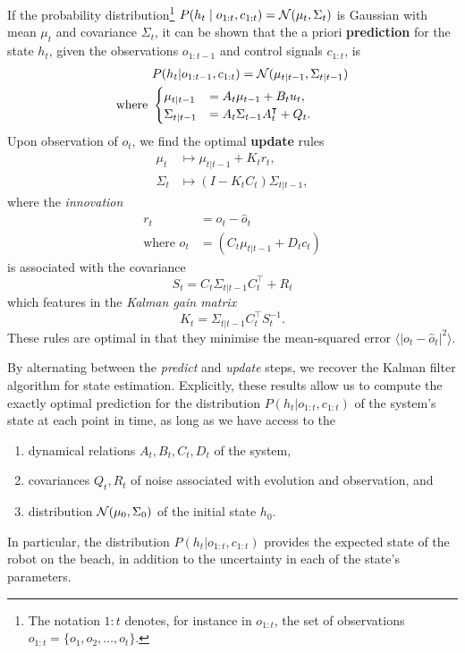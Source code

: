         If the probability distribution\footnote{The notation $1:t$ denotes, for instance in $o_{1:t}$, the set of observations $o_{1:t} = \{o_1, o_2, \ldots, o_t\}$.} $P(h_t \mid o_{1:t}, c_{1:t}) = \mathcal{N}(\mu_t, \Sigma_t)$ is Gaussian with mean $\mu_t$ and covariance $\Sigma_t$, it can be shown that the a priori \textbf{prediction} for the state $h_t$, given the observations $o_{1:t-1}$ and control signals $c_{1:t}$, is
        \begin{align}
            &P(h_t | o_{1:t-1}, c_{1:t}) = \mathcal{N}(\mu_{t|t-1}, \Sigma_{t|t-1}) \\
            \text{where }
            &\begin{cases}
                \mu_{t|t-1} &= A_t \mu_{t-1} + B_t u_t, \\
                \Sigma_{t|t-1} &= A_t \Sigma_{t-1} A_t^\intercal + Q_t.
            \end{cases}
        \end{align}
        Upon observation of $o_t$, we find the optimal \textbf{update} rules
        \begin{align}
            \mu_t &\mapsto \mu_{t|t-1} + K_t r_t, \\
            \Sigma_t &\mapsto (I - K_t C_t) \Sigma_{t|t-1},
        \end{align}
        where the \emph{innovation}
        \begin{align}
            r_t &= o_t - \hat{o}_t \\
            \text{where }\hat{o}_t &= (C_t \mu_{t|t-1} + D_t c_t)
        \end{align}
        is associated with the covariance
        \begin{equation}
            S_t = C_t \Sigma_{t|t-1} C_t^\intercal + R_t
        \end{equation}
        which features in the \emph{Kalman gain matrix}
        \begin{equation}
            K_t = \Sigma_{t|t-1} C_t^\intercal S_t^{-1}.
        \end{equation}
        These rules are optimal in that they minimise the mean-squared error $\langle \lvert o_t - \hat{o}_t \rvert^2 \rangle$.

        By alternating between the \emph{predict} and \emph{update} steps, we recover the Kalman filter algorithm for state estimation.
        Explicitly, these results allow us to compute the exactly optimal prediction for the distribution $P(h_t | o_{1:t}, c_{1:t})$ of the system's state at each point in time, as long as we have access to the
        \begin{enumerate}
            \item dynamical relations $A_t, B_t, C_t, D_t$ of the system,
            \item covariances $Q_t, R_t$ of noise associated with evolution and observation, and
            \item distribution $\mathcal{N}(\mu_0, \Sigma_0)$ of the initial state $h_0$.
        \end{enumerate}
        In particular, the distribution $P(h_t | o_{1:t}, c_{1:t})$ provides the expected state of the robot on the beach, in addition to the uncertainty in each of the state's parameters.

